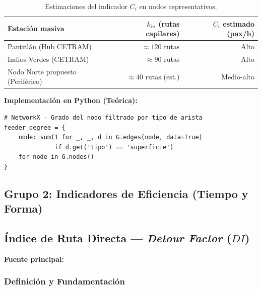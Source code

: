 \begin{table}[H]
    \centering
    \caption{Estimaciones del indicador $C_i$ en nodos representativos.}
    \label{tab:capilar-nodos}
    \begin{tabularx}{\textwidth}{X r r}
        \toprule
        \textbf{Estación masiva} &
        \textbf{$k_{in}$ (rutas capilares)} &
        \textbf{$C_i$ estimado (pax/h)} \\
        \midrule
        Pantitlán (Hub CETRAM)          & $\approx 120$ rutas & Alto \\
        Indios Verdes (CETRAM)          & $\approx 90$ rutas  & Alto \\
        Nodo Norte propuesto (Periférico) & $\approx 40$ rutas (est.) & Medio-alto \\
        \bottomrule
    \end{tabularx}
\end{table}
 
\textbf{Implementación en Python (Teórica):}
 
\begin{lstlisting}[style=estiloPython, caption={Cálculo de grado capilar por nodo con NetworkX.}, label={lst:fuerza-nodal}]
# NetworkX - Grado del nodo filtrado por tipo de arista
feeder_degree = {
    node: sum(1 for _, _, d in G.edges(node, data=True)
              if d.get('tipo') == 'superficie')
    for node in G.nodes()
}
\end{lstlisting}


\subsection*{Grupo 2: Indicadores de Eficiencia (Tiempo y Forma)}
 
\subsection{Índice de Ruta Directa --- \texorpdfstring{\textit{Detour Factor} ($DI$)}{Detour Factor (DI)}}
\label{subsec:ruta-directa}
 
\textbf{Fuente principal:} \citet{fortin2016innovative}
 
\subsubsection{Definición y Fundamentación}
 
